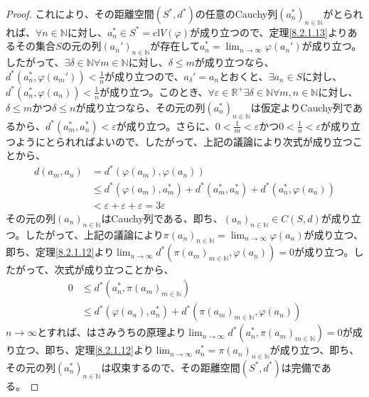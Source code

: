 \documentclass[dvipdfmx]{jsarticle}
\begin{document}
\begin{proof}
これにより、その距離空間$\left( S^{*},d^{*} \right)$の任意のCauchy列$\left( a_{n}^{*} \right)_{n \in \mathbb{N}}$がとられれば、$\forall n \in \mathbb{N}$に対し、$a_{n}^{*} \in S^{*} = {\mathrm{cl}}{V(\varphi)}$が成り立つので、定理\ref{8.2.1.13}よりあるその集合$S$の元の列$\left( a_{n}' \right)_{n \in \mathbb{N}}$が存在して$a_{n}^{*} = \lim_{n \rightarrow \infty}{\varphi\left( a_{n}' \right)}$が成り立つ。したがって、$\exists\delta \in \mathbb{N}\forall m \in \mathbb{N}$に対し、$\delta \leq m$が成り立つなら、$d^{*}\left( a_{n}^{*},\varphi\left( a_{m}' \right) \right) < \frac{1}{n}$が成り立つので、$a_{\delta}' = a_{n}$とおくと、$\exists a_{n} \in S$に対し、$d^{*}\left( a_{n}^{*},\varphi\left( a_{n} \right) \right) < \frac{1}{n}$が成り立つ。このとき、$\forall\varepsilon \in \mathbb{R}^{+}\exists\delta \in \mathbb{N}\forall m,n \in \mathbb{N}$に対し、$\delta \leq m$かつ$\delta \leq n$が成り立つなら、その元の列$\left( a_{n}^{*} \right)_{n \in \mathbb{N}}$は仮定よりCauchy列であるから、$d^{*}\left( a_{m}^{*},a_{n}^{*} \right) < \varepsilon$が成り立つ。さらに、$0 < \frac{1}{m} < \varepsilon$かつ$0 < \frac{1}{n} < \varepsilon$が成り立つようにとられればよいので、したがって、上記の議論により次式が成り立つことから、
\begin{align*}
d\left( a_{m},a_{n} \right) &= d^{*}\left( \varphi\left( a_{m} \right),\varphi\left( a_{n} \right) \right)\\
&\leq d^{*}\left( \varphi\left( a_{m} \right),a_{m}^{*} \right) + d^{*}\left( a_{m}^{*},a_{n}^{*} \right) + d^{*}\left( a_{n}^{*},\varphi\left( a_{n} \right) \right)\\
&< \varepsilon + \varepsilon + \varepsilon = 3\varepsilon
\end{align*}
その元の列$\left( a_{n} \right)_{n \in \mathbb{N}}$はCauchy列である、即ち、$\left( a_{n} \right)_{n \in \mathbb{N}} \in C(S,d)$が成り立つ。したがって、上記の議論により$\pi\left( a_{n} \right)_{n \in \mathbb{N}} = \lim_{n \rightarrow \infty}{\varphi\left( a_{n} \right)}$が成り立つ、即ち、定理\ref{8.2.1.12}より$\lim_{n \rightarrow \infty}{d^{*}\left( \pi\left( a_{m} \right)_{m \in \mathbb{N}},\varphi\left( a_{n} \right) \right)} = 0$が成り立つ。したがって、次式が成り立つことから、
\begin{align*}
0 &\leq d^{*}\left( a_{n}^{*},\pi\left( a_{m} \right)_{m \in \mathbb{N}} \right)\\
&\leq d^{*}\left( \varphi\left( a_{n} \right),a_{n}^{*} \right) + d^{*}\left( \pi\left( a_{m} \right)_{m \in \mathbb{N}},\varphi\left( a_{n} \right) \right)
\end{align*}
$n \rightarrow \infty$とすれば、はさみうちの原理より$\lim_{n \rightarrow \infty}{d^{*}\left( a_{n}^{*},\pi\left( a_{m} \right)_{m \in \mathbb{N}} \right)} = 0$が成り立つ、即ち、定理\ref{8.2.1.12}より$\lim_{n \rightarrow \infty}a_{n}^{*} = \pi\left( a_{n} \right)_{n \in \mathbb{N}}$が成り立つ、即ち、その元の列$\left( a_{n}^{*} \right)_{n \in \mathbb{N}}$は収束するので、その距離空間$\left( S^{*},d^{*} \right)$は完備である。
\end{proof}
\end{document}
